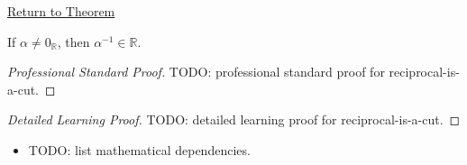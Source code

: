 \newpage
{}
\label{prf:reciprocal-is-a-cut}

\begin{remark*}[Return]
\hyperref[lem:reciprocal-is-a-cut]{Return to Theorem}
\end{remark*}

\begin{lemma*}
If $\alpha\ne0_{\mathbb{R}}$, then $\alpha^{-1}\in\mathbb{R}$.
\end{lemma*}

\begin{proof}[Professional Standard Proof]
\LRAProofBodyStart
TODO: professional standard proof for reciprocal-is-a-cut.
\end{proof}

\begin{proof}[Detailed Learning Proof]
\LRAProofBodyStart
TODO: detailed learning proof for reciprocal-is-a-cut.
\end{proof}

\begin{remark*}
\end{remark*}

\begin{dependencies}
\begin{itemize}
  \item TODO: list mathematical dependencies.
\end{itemize}
\end{dependencies}

\clearpage
